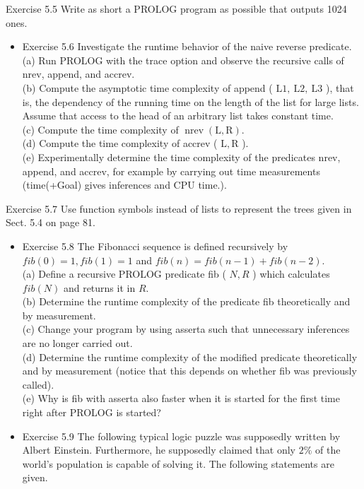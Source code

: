 \documentclass[10pt]{article}
\begin{document}
Exercise 5.5 Write as short a PROLOG program as possible that outputs 1024 ones.

\begin{itemize}
  \item Exercise 5.6 Investigate the runtime behavior of the naive reverse predicate.\\

(a) Run PROLOG with the trace option and observe the recursive calls of nrev, append, and accrev.\\
(b) Compute the asymptotic time complexity of append ( $\mathrm{L} 1, \mathrm{~L} 2, \mathrm{~L} 3$ ), that is, the dependency of the running time on the length of the list for large lists. Assume that access to the head of an arbitrary list takes constant time.\\
(c) Compute the time complexity of $\operatorname{nrev}(\mathrm{L}, \mathrm{R})$.\\
(d) Compute the time complexity of accrev ( $\mathrm{L}, \mathrm{R}$ ).\\
(e) Experimentally determine the time complexity of the predicates nrev, append, and accrev, for example by carrying out time measurements (time(+Goal) gives inferences and CPU time.).
\end{itemize}

Exercise 5.7 Use function symbols instead of lists to represent the trees given in Sect. 5.4 on page 81.

\begin{itemize}
  \item Exercise 5.8 The Fibonacci sequence is defined recursively by $f i b(0)=1, f i b(1)=1$ and $f i b(n)=f i b(n-1)+f i b(n-2)$.\\
(a) Define a recursive PROLOG predicate fib ( $N, R$ ) which calculates $f i b(N)$ and returns it in $R$.\\
(b) Determine the runtime complexity of the predicate fib theoretically and by measurement.\\
(c) Change your program by using asserta such that unnecessary inferences are no longer carried out.\\
(d) Determine the runtime complexity of the modified predicate theoretically and by measurement (notice that this depends on whether fib was previously called).\\
(e) Why is fib with asserta also faster when it is started for the first time right after PROLOG is started?
  \item Exercise 5.9 The following typical logic puzzle was supposedly written by Albert Einstein. Furthermore, he supposedly claimed that only $2 \%$ of the world's population is capable of solving it. The following statements are given.
\end{itemize}
\end{document}
